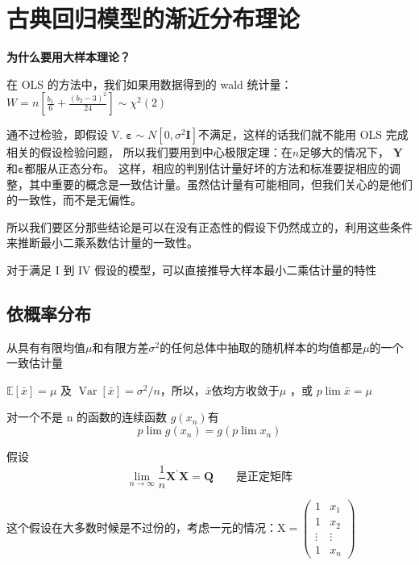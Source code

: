 \section{古典回归模型的渐近分布理论}
{\bf 为什么要用大样本理论？} 

在 OLS 的方法中，我们如果用数据得到的 wald 统计量：$ W = n\left[\frac{b_{1}}{6}+\frac{\left(b_{2}-3\right)^{2}}{24}\right] \sim \chi^{2}(2) $

通不过检验，即假设$\operatorname{V .}  \boldsymbol{\varepsilon} \sim N\left[0, \sigma^{2}  \boldsymbol{I} \right]$不满足，这样的话我们就不能用 OLS 完成相关的假设检验问题，
所以我们要用到中心极限定理：在$ n $足够大的情况下， $  \boldsymbol{Y} $ 和$  \boldsymbol{\varepsilon} $都服从正态分布。
这样，相应的判别估计量好坏的方法和标准要捉相应的调整，其中重要的概念是一致估计量。虽然估计量有可能相同，但我们关心的是他们的一致性，而不是无偏性。

所以我们要区分那些结论是可以在没有正态性的假设下仍然成立的，利用这些条件来推断最小二乘系数估计量的一致性。

对于满足 I 到 IV 假设的模型，可以直接推导大样本最小二乘估计量的特性

\subsection{依概率分布}

\begin{theorem}[依概率分布]
    从具有有限均值$ \mu $和有限方差$\sigma^{ 2 }$的任何总体中抽取的随机样本的均值都是$ \mu $的一个一致估计量
    \begin{myproof}
        $\mathbb {E}[\bar{x}]=\mu $ 及  $ \operatorname{Var}[\bar{x}]=\sigma^{2} / n $，所以，$ \bar{x} $依均方收敛于$ \mu $ ，或 $ p \lim\bar{x}=\mu $
    \end{myproof}
\end{theorem}
\begin{theorem}
    对一个不是 n 的函数的连续函数 $ g\left(x_{n}\right) $有
    $$ p \lim g\left(x_{n}\right)=g\left(p \lim x_{n}\right) $$
\end{theorem}

假设 
\begin{equation}
     \lim _{n \rightarrow \infty} \frac{1}{n}  \boldsymbol{X^{\prime} X=Q } \qquad  \text{是正定矩阵} 
     \label{eq 7.2.1}
\end{equation}

这个假设在大多数时候是不过份的，考虑一元的情况：$  \boldsymbol{\mathrm{X}}=\left(\begin{array}{cc}
    1 & x_{1} \\
    1 & x_{2} \\
    \vdots & \vdots \\
    1 & x_{n}
    \end{array}\right) $
    

